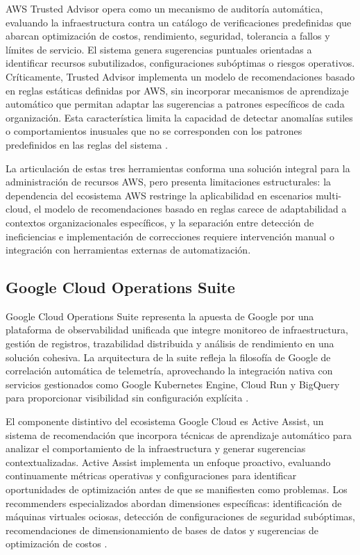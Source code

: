 AWS Trusted Advisor opera como un mecanismo de auditoría automática, evaluando la infraestructura contra un catálogo de verificaciones predefinidas que abarcan optimización de costos, rendimiento, seguridad, tolerancia a fallos y límites de servicio. El sistema genera sugerencias puntuales orientadas a identificar recursos subutilizados, configuraciones subóptimas o riesgos operativos. Críticamente, Trusted Advisor implementa un modelo de recomendaciones basado en reglas estáticas definidas por AWS, sin incorporar mecanismos de aprendizaje automático que permitan adaptar las sugerencias a patrones específicos de cada organización. Esta característica limita la capacidad de detectar anomalías sutiles o comportamientos inusuales que no se corresponden con los patrones predefinidos en las reglas del sistema \parencite{AWS2026}.

La articulación de estas tres herramientas conforma una solución integral para la administración de recursos AWS, pero presenta limitaciones estructurales: la dependencia del ecosistema AWS restringe la aplicabilidad en escenarios multi-cloud, el modelo de recomendaciones basado en reglas carece de adaptabilidad a contextos organizacionales específicos, y la separación entre detección de ineficiencias e implementación de correcciones requiere intervención manual o integración con herramientas externas de automatización.

\subsection{Google Cloud Operations Suite}

Google Cloud Operations Suite representa la apuesta de Google por una plataforma de observabilidad unificada que integre monitoreo de infraestructura, gestión de registros, trazabilidad distribuida y análisis de rendimiento en una solución cohesiva. La arquitectura de la suite refleja la filosofía de Google de correlación automática de telemetría, aprovechando la integración nativa con servicios gestionados como Google Kubernetes Engine, Cloud Run y BigQuery para proporcionar visibilidad sin configuración explícita \parencite{GoogleCloud2026}.

El componente distintivo del ecosistema Google Cloud es Active Assist, un sistema de recomendación que incorpora técnicas de aprendizaje automático para analizar el comportamiento de la infraestructura y generar sugerencias contextualizadas. Active Assist implementa un enfoque proactivo, evaluando continuamente métricas operativas y configuraciones para identificar oportunidades de optimización antes de que se manifiesten como problemas. Los recommenders especializados abordan dimensiones específicas: identificación de máquinas virtuales ociosas, detección de configuraciones de seguridad subóptimas, recomendaciones de dimensionamiento de bases de datos y sugerencias de optimización de costos \parencite{GoogleCloud2026}.

